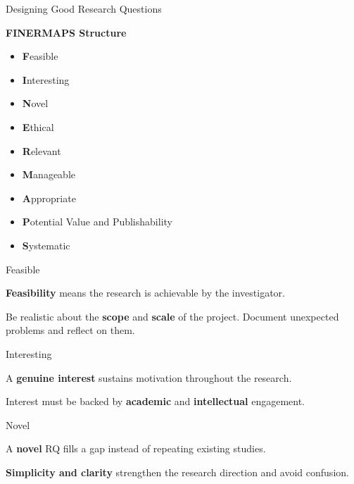 \begin{frame}{Designing Good Research Questions}
  \begin{block}{\textbf{FINERMAPS Structure}}
    \begin{itemize}
      \onslide<+-> \item \textbf{F}easible
      \onslide<+-> \item \textbf{I}nteresting
      \onslide<+-> \item \textbf{N}ovel
      \onslide<+-> \item \textbf{E}thical
      \onslide<+-> \item \textbf{R}elevant
      \onslide<+-> \item \textbf{M}anageable
      \onslide<+-> \item \textbf{A}ppropriate
      \onslide<+-> \item \textbf{P}otential Value and Publishability
      \onslide<+-> \item \textbf{S}ystematic
  \end{itemize}
\end{block}
\end{frame}

\begin{frame}{Feasible}
  \begin{block}{}
    \onslide<+-> \textbf{Feasibility} means the research is achievable by the
    investigator.

    \vspace{0.3cm}

    \onslide<+-> Be realistic about the \textbf{scope} and \textbf{scale} of the
    project.
    Document unexpected problems and reflect on them.
  \end{block}
\end{frame}

\begin{frame}{Interesting}
  \begin{block}{}
    \onslide<+-> A \textbf{genuine interest} sustains motivation throughout the
    research.

    \vspace{0.3cm}

    \onslide<+-> Interest must be backed by \textbf{academic} and
    \textbf{intellectual} engagement.
  \end{block}
\end{frame}

\begin{frame}{Novel}
  \begin{block}{}
    \onslide<+-> A \textbf{novel} RQ fills a gap instead of repeating existing
    studies.

    \vspace{0.3cm}

    \onslide<+-> \textbf{Simplicity and clarity} strengthen the research
    direction and avoid confusion.
  \end{block}
\end{frame}

